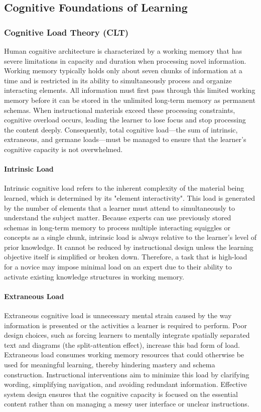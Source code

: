\subsection{Cognitive Foundations of Learning}
\subsubsection{Cognitive Load Theory (CLT)}

Human cognitive architecture is characterized by a working memory that has severe limitations in capacity and duration when processing novel information. Working memory typically holds only about seven chunks of information at a time and is restricted in its ability to simultaneously process and organize interacting elements. All information must first pass through this limited working memory before it can be stored in the unlimited long-term memory as permanent schemas. When instructional materials exceed these processing constraints, cognitive overload occurs, leading the learner to lose focus and stop processing the content deeply. Consequently, total cognitive load—the sum of intrinsic, extraneous, and germane loads—must be managed to ensure that the learner's cognitive capacity is not overwhelmed\cite{Cog2019Sweller}.

\paragraph{Intrinsic Load}
Intrinsic cognitive load refers to the inherent complexity of the material being learned, which is determined by its "element interactivity". This load is generated by the number of elements that a learner must attend to simultaneously to understand the subject matter. Because experts can use previously stored schemas in long-term memory to process multiple interacting squiggles or concepts as a single chunk, intrinsic load is always relative to the learner’s level of prior knowledge. It cannot be reduced by instructional design unless the learning objective itself is simplified or broken down. Therefore, a task that is high-load for a novice may impose minimal load on an expert due to their ability to activate existing knowledge structures in working memory\cite{perkins2024clt}.

\paragraph{Extraneous Load}
Extraneous cognitive load is unnecessary mental strain caused by the way information is presented or the activities a learner is required to perform. Poor design choices, such as forcing learners to mentally integrate spatially separated text and diagrams (the split-attention effect), increase this bad form of load. Extraneous load consumes working memory resources that could otherwise be used for meaningful learning, thereby hindering mastery and schema construction. Instructional interventions aim to minimize this load by clarifying wording, simplifying navigation, and avoiding redundant information. Effective system design ensures that the cognitive capacity is focused on the essential content rather than on managing a messy user interface or unclear instructions\cite{studiomg_cognitive_ai}.

